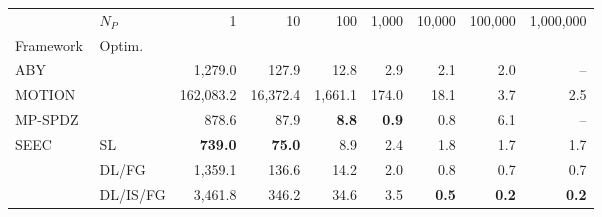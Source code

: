 \begin{tabular}{llrrrrrrr}
\toprule
 & $N_P$ & 1 & 10 & 100 & 1,000 & 10,000 & 100,000 & 1,000,000 \\
Framework & Optim. &  &  &  &  &  &  &  \\
\midrule
ABY~\cite{DSZ15} &  & 1,279.0 & 127.9 & 12.8 & 2.9 & 2.1 & 2.0 & -- \\
\cline{1-9}
MOTION~\cite{BDST22} &  & 162,083.2 & 16,372.4 & 1,661.1 & 174.0 & 18.1 & 3.7 & 2.5 \\
\cline{1-9}
MP-SPDZ~\cite{CCS:Keller20} &  & 878.6 & 87.9 & \bfseries 8.8 & \bfseries 0.9 & 0.8 & 6.1 & -- \\
\cline{1-9}
\multirow[c]{3}{*}{SEEC} & SL & \bfseries 739.0 & \bfseries 75.0 & 8.9 & 2.4 & 1.8 & 1.7 & 1.7 \\
 & DL/FG & 1,359.1 & 136.6 & 14.2 & 2.0 & 0.8 & 0.7 & 0.7 \\
 & DL/IS/FG & 3,461.8 & 346.2 & 34.6 & 3.5 & \bfseries 0.5 & \bfseries 0.2 & \bfseries 0.2 \\
\bottomrule
\end{tabular}

